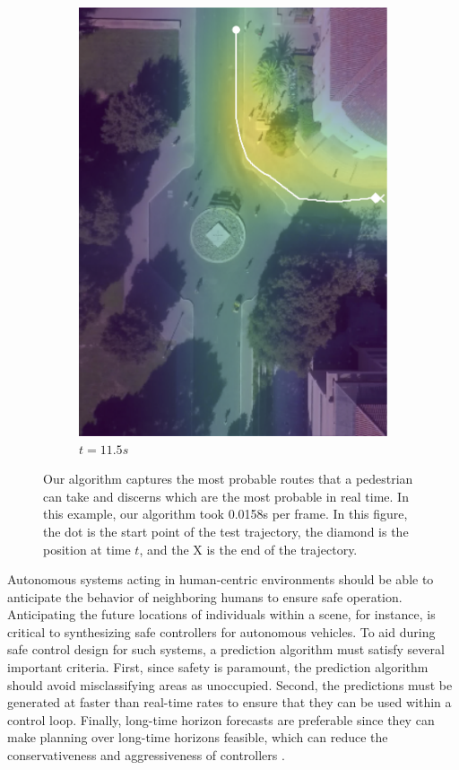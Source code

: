 \documentclass[conference]{IEEEtran}
\begin{document}
\begin{figure}
\begin{subfigure}[b]{.45\linewidth}
		\includegraphics[width=\linewidth]{./figures/FirstPage/gates_1_2_t=345.png}
		\caption{$t=11.5s$}
	\end{subfigure}
	\caption{Our algorithm captures the most probable routes that a pedestrian can take and discerns which are the most probable in real time. In this example, our algorithm took 0.0158s per frame.  In this figure, the dot is the start point of the test trajectory, the diamond is the position at time $t$, and the X is the end of the trajectory.}
	\label{fig:gates-1-2}
\end{figure}

Autonomous systems acting in human-centric environments should be able to anticipate the behavior of neighboring humans to ensure safe operation. 
Anticipating the future locations of individuals within a scene, for instance, is critical to synthesizing safe controllers for autonomous vehicles.
To aid during safe control design for such systems, a prediction algorithm must satisfy several important criteria.
First, since safety is paramount, the prediction algorithm should avoid misclassifying areas as unoccupied.
Second, the predictions must be generated at faster than real-time rates to ensure that they can be used within a control loop.
Finally, long-time horizon forecasts are preferable since they can make planning over long-time horizons feasible, which can reduce the conservativeness and aggressiveness of controllers \cite{}.
\end{document}

